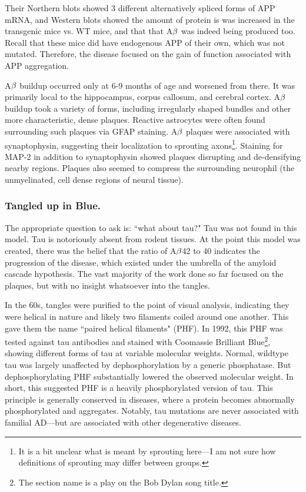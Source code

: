 Their Northern blots showed 3 different alternatively spliced forms of APP mRNA, and Western blots showed the amount of protein is was increased in the transgenic mice vs. WT mice, and that that A$\beta$ was indeed being produced too. Recall that these mice did have endogenous APP of their own, which was not mutated. Therefore, the disease focused on the gain of function associated with APP aggregation.\newline

A$\beta$ buildup occurred only at 6-9 months of age and worsened from there. It was primarily local to the hippocampus, corpus callosum, and cerebral cortex. A$\beta$ buildup took a variety of forms, including irregularly shaped bundles and other more characteristic, dense plaques. Reactive astrocytes were often found surrounding such plaques via GFAP staining. A$\beta$ plaques were associated with synaptophysin, suggesting their localization to sprouting axons\footnote{It is a bit unclear what is meant by sprouting here---I am not sure how definitions of sprouting may differ between groups.}. Staining for MAP-2 in addition to synaptophysin showed plaques disrupting and de-densifying nearby regions. Plaques also seemed to compress the surrounding neurophil (the unmyelinated, cell dense regions of neural tissue). 

\subsubsection*{Tangled up in Blue.}

The appropriate question to ask is: ``what about tau?" Tau was not found in this model. Tau is notoriously absent from rodent tissues. At the point this model was created, there was the belief that the ratio of A$\beta$42 to 40 indicates the progression of the disease, which existed under the umbrella of the amyloid cascade hypothesis. The vast majority of the work done so far focused on the plaques, but with no insight whatsoever into the tangles.\newline

 In the 60s, tangles were purified to the point of visual analysis, indicating they were helical in nature and likely two filaments coiled around one another. This gave them the name ``paired helical filaments" (PHF). In 1992, this PHF was tested against tau antibodies and stained with Coomassie Brilliant Blue\footnote{The section name is a play on the Bob Dylan song title.}, showing different forms of tau at variable molecular weights. Normal, wildtype tau was largely unaffected by dephosphorylation by a generic phosphatase. But dephosphorylating PHF substantially lowered the observed molecular weight. In short, this suggested PHF is a heavily phosphorylated version of tau. This principle is generally conserved in diseases, where a protein becomes abnormally phosphorylated and aggregates. Notably, tau mutations are never associated with familial AD---but are associated with other degenerative diseases.\newline

